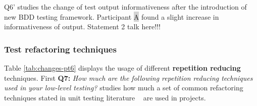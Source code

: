     \begin{table}[H]
            \caption {Low-level test output informativeness and changes in it} \label{tab:changes-pt5}
    \end{table}

Q6' studies the change of test output informativeness after the introduction of new BDD testing framework. Participant {\colorbox{lightgray}A}
found a slight increase in informativeness of output. Statement 2 talk here!!!

\clearpage
\subsubsection{Test refactoring techniques}

Table \ref{tab:changes-pt6} displays the usage of different \textbf{repetition reducing} techniques. First \textbf{Q7:}
\textit{How much are the following repetition reducing techniques used in your low-level testing?} studies how much a
set of common refactoring techniques stated in unit testing literature ~\cite{artofunit2013} are used in projects.

